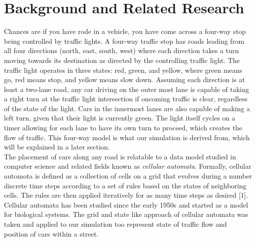 \documentclass[conference]{IEEEtran}
\begin{document}
\section{Background and Related Research}
Chances are if you have rode in a vehicle, you have come across a four-way stop being controlled by traffic lights. A four-way traffic stop has roads leading from all four directions (north, east, south, west) where each direction takes a turn moving towards its destination as directed by the controlling traffic light. The traffic light operates in three states: red, green, and yellow, where green means go, red means stop, and yellow means slow down. Assuming each direction is at least a two-lane road, any car driving on the outer most lane is capable of taking a right turn at the traffic light intersection if oncoming traffic is clear, regardless of the state of the light. Cars in the innermost lanes are also capable of making a left turn, given that their light is currently green. The light itself cycles on a timer allowing for each lane to have its own turn to proceed, which creates the flow of traffic. This four-way model is what our simulation is derived from, which will be explained in a later section. \\
\hspace*{.2cm} The placement of cars along any road is relatable to a data model studied in computer science and related fields known as \textit{cellular automata}. Formally, cellular automota is defined as a collection of cells on a grid that evolves during a number discrete time steps according to a set of rules based on the states of neighboring cells. The rules are then applied iteratively for as many time steps as desired [1]. Cellular automata has been studied since the early 1950s and started as a model for biological systems. The grid and state like approach of cellular automata was taken and applied to our simulation too represent state of traffic flow and position of cars within a street.
\end{document}
